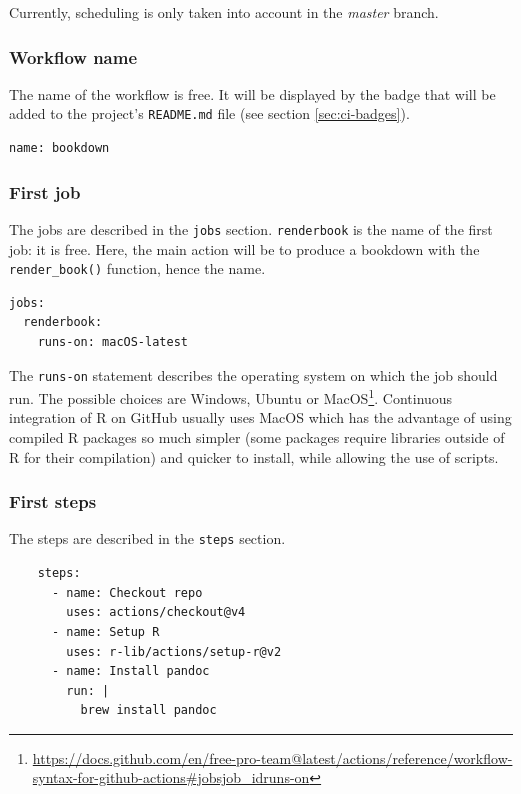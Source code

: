 \documentclass[
  12pt,
  american,
  a4paper,
  extrafontsizes,onecolumn,openright
  ]{memoir}
\begin{document}
Currently, scheduling is only taken into account in the \emph{master} branch.

\hypertarget{workflow-name}{%
\subsubsection{Workflow name}\label{workflow-name}}

The name of the workflow is free.
It will be displayed by the badge that will be added to the project's \texttt{README.md} file (see section \ref{sec:ci-badges}).

\begin{verbatim}
name: bookdown
\end{verbatim}

\hypertarget{first-job}{%
\subsubsection{First job}\label{first-job}}

The jobs are described in the \texttt{jobs} section.
\texttt{renderbook} is the name of the first job: it is free.
Here, the main action will be to produce a bookdown with the \texttt{render\_book()} function, hence the name.

\begin{verbatim}
jobs:
  renderbook:
    runs-on: macOS-latest
\end{verbatim}

The \texttt{runs-on} statement describes the operating system on which the job should run.
The possible choices are Windows, Ubuntu or MacOS\footnote{\url{https://docs.github.com/en/free-pro-team@latest/actions/reference/workflow-syntax-for-github-actions\#jobsjob_idruns-on}}.
Continuous integration of R on GitHub usually uses MacOS which has the advantage of using compiled R packages so much simpler (some packages require libraries outside of R for their compilation) and quicker to install, while allowing the use of scripts.

\hypertarget{first-steps}{%
\subsubsection{First steps}\label{first-steps}}

The steps are described in the \texttt{steps} section.

\begin{verbatim}
    steps:
      - name: Checkout repo
        uses: actions/checkout@v4
      - name: Setup R
        uses: r-lib/actions/setup-r@v2
      - name: Install pandoc
        run: |
          brew install pandoc
\end{verbatim}
\end{document}

